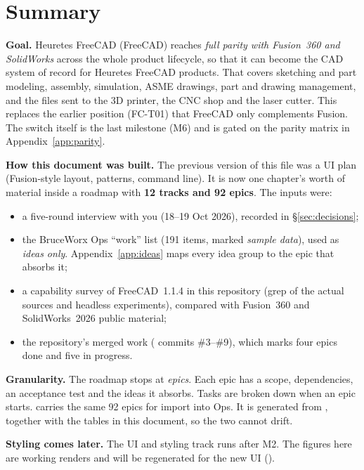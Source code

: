 \section{Summary}\label{sec:summary}

\textbf{Goal.} Heuretes FreeCAD (FreeCAD) reaches \emph{full parity with Fusion~360 and SolidWorks} across the
whole product lifecycle, so that it can become the CAD system of record for Heuretes FreeCAD products. That covers
sketching and part modeling, assembly, simulation, ASME drawings, part and drawing management, and the
files sent to the 3D printer, the CNC shop and the laser cutter. This replaces the earlier position
(FC-T01) that FreeCAD only complements Fusion. The switch itself is the last milestone (M6) and is gated on the parity
matrix in Appendix~\ref{app:parity}.

\textbf{How this document was built.} The previous version of this file was a UI plan (Fusion-style
layout, patterns, command line). It is now one chapter's worth of material inside a roadmap with
\textbf{12 tracks and 92 epics}. The inputs were:
\begin{itemize}
  \item a five-round interview with you (18--19 Oct 2026), recorded in \S\ref{sec:decisions};
  \item the BruceWorx Ops ``work'' list (191 items, marked \emph{sample data}), used as \emph{ideas only}.
        Appendix~\ref{app:ideas} maps every idea group to the epic that absorbs it;
  \item a capability survey of FreeCAD~1.1.4 in this repository (grep of the actual sources and headless
        experiments), compared with Fusion~360 and SolidWorks~2026 public material;
  \item the repository's merged work (\code{[BW]} commits \#3--\#9), which marks four epics done and five in
        progress.
\end{itemize}

\textbf{Granularity.} The roadmap stops at \emph{epics}. Each epic has a scope, dependencies, an acceptance test and
the ideas it absorbs. Tasks are broken down when an epic starts.  carries the same
92 epics for import into Ops. It is generated from , together with the tables in this
document, so the two cannot drift.

\textbf{Styling comes later.} The UI and styling track runs after M2. The figures here are working renders
and will be regenerated for the new UI ().

